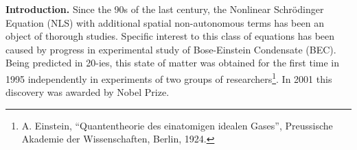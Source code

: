 \documentclass[candidate, href, colorlinks]{disser}
\begin{document}
%	
%	
%
%
%
%
%
%


\textbf{Introduction.}
Since the 90s of the last century, the Nonlinear Schr\"odinger Equation (NLS) with additional spatial non-autonomous terms has been an object of thorough studies.
Specific interest to this class of equations has been caused by progress in experimental study of Bose-Einstein Condensate (BEC).
Being predicted in 20-ies, this state of matter was obtained for the first time in 1995 independently in experiments of two groups of researchers\footnote{A. Einstein, ``Quantentheorie des einatomigen idealen Gases'', Preussische Akademie der Wissenschaften, Berlin, 1924.}.
In 2001 this discovery was awarded by Nobel Prize.
\end{document}

